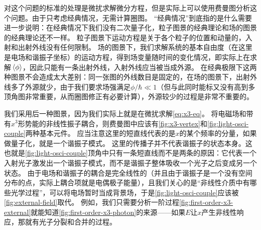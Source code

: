 对这个问题的标准的处理是微扰求解微分方程，但是实际上可以使用费曼图分析这个问题。由于只考虑经典情况，无需计算圈图。
“经典情况”到底指的是什么需要进一步说明：在经典情况下我们没有二次量子化，粒子图景的经典理论和场的图景的经典理论还不一样。
粒子图景下运动方程是关于各个粒子的位置和动量的，入射和出射外线没有任何限制。
场的图景下，我们求解系统的基本自由度（在这里是电场和谐振子坐标）的运动方程，得到场变量随时间的变化情况，即实际上在求解$\expval*{\phi}$，因此只能有一条出射外线，入射外线应当被当成外源。
在经典极限下这两种图景不会造成太大差别：同一张图的外线数目是固定的，在场的图景下，出射外线多了外源就少，由于我们要求场强满足$\phi / \hbar \ll 1$（但与此同时能标又没有高到多顶角图非常重要，从而圈图修正有必要计算），外源较少的过程是非常不重要的。

我们采用后一种图景，因为我们实际上就是在微扰求解\eqref{eq:x3-eq}。
将电磁场和带有$x^3$形势能的非线性振子耦合，则费曼图中应该有\autoref{fig:x3-vertex}和\autoref{fig:light-osci-couple}两种基本元件。
应当注意这里的短直线代表的是$x$的某个频率的分量，如果做量子化，就是一个谐振子模式。
这里的传播子并不代表谐振子的状态本身。这也就是\autoref{fig:light-osci-couple}顶角中只有一条短直线而不是两条的原因：它代表一个入射光子激发出一个谐振子模式，而不是谐振子整体吸收一个光子之后变成另一个状态。
由于电场和谐振子的耦合是完全线性的（并且由于谐振子是一个没有空间分布的点，实际上耦合项就是电偶极子能量），且我们关心的是“非线性介质中有哪些光学过程”，可以将电场暂时当成背景场，于是\autoref{fig:light-osci-couple}应该被\autoref{fig:external-field}取代。
例如，我们只需要分析一阶过程\autoref{fig:first-order-x3-external}就能知道\autoref{fig:first-order-x3-photon}的来源——如果$E$让$x$产生非线性响应，那就有光子分裂和合并的过程。

